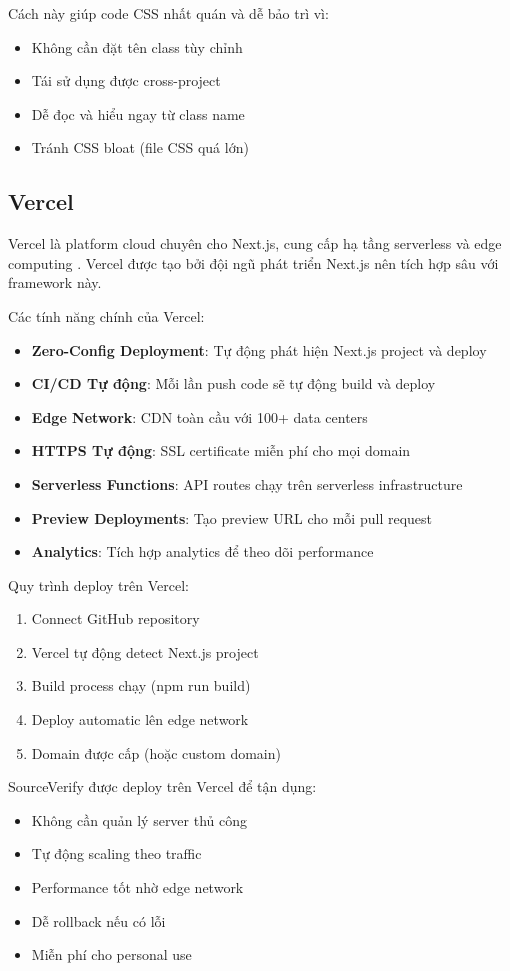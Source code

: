 Cách này giúp code CSS nhất quán và dễ bảo trì vì:
\begin{itemize}
  \item Không cần đặt tên class tùy chỉnh
  \item Tái sử dụng được cross-project
  \item Dễ đọc và hiểu ngay từ class name
  \item Tránh CSS bloat (file CSS quá lớn)
\end{itemize}

\subsection{Vercel}
Vercel là platform cloud chuyên cho Next.js, cung cấp hạ tầng serverless và edge computing \cite{nextjs}. Vercel được tạo bởi đội ngũ phát triển Next.js nên tích hợp sâu với framework này.

Các tính năng chính của Vercel:
\begin{itemize}
  \item \textbf{Zero-Config Deployment}: Tự động phát hiện Next.js project và deploy
  \item \textbf{CI/CD Tự động}: Mỗi lần push code sẽ tự động build và deploy
  \item \textbf{Edge Network}: CDN toàn cầu với 100+ data centers
  \item \textbf{HTTPS Tự động}: SSL certificate miễn phí cho mọi domain
  \item \textbf{Serverless Functions}: API routes chạy trên serverless infrastructure
  \item \textbf{Preview Deployments}: Tạo preview URL cho mỗi pull request
  \item \textbf{Analytics}: Tích hợp analytics để theo dõi performance
\end{itemize}

Quy trình deploy trên Vercel:
\begin{enumerate}
  \item Connect GitHub repository
  \item Vercel tự động detect Next.js project
  \item Build process chạy (npm run build)
  \item Deploy automatic lên edge network
  \item Domain được cấp (hoặc custom domain)
\end{enumerate}

SourceVerify được deploy trên Vercel để tận dụng:
\begin{itemize}
  \item Không cần quản lý server thủ công
  \item Tự động scaling theo traffic
  \item Performance tốt nhờ edge network
  \item Dễ rollback nếu có lỗi
  \item Miễn phí cho personal use
\end{itemize}

